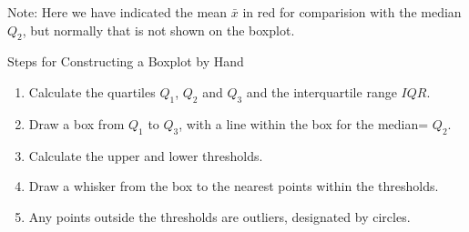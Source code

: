 \documentclass[t,xcolor=pdftex,dvipsnames,table]{beamer}
\begin{document}
\begin{frame}[fragile]{}
\vspace{1cm}

\vspace{.5cm}
Note: Here we have indicated the mean $\bar{x}$ in red for comparision with the median $Q_{2}$, but normally that is not shown on the boxplot.
\end{frame}

\begin{frame}[fragile]{Steps for Constructing a Boxplot by Hand}
\begin{enumerate}
\item Calculate the quartiles $Q_1$, $Q_2$ and $Q_3$ and the interquartile range $IQR$. 
\item Draw a box from $Q_1$ to $Q_3$, with a line within the box for the median= $Q_2$.
\item Calculate the upper and lower thresholds.
\item Draw a whisker from the box to the nearest points within the thresholds.
\item Any points outside the thresholds are outliers, designated by circles.
\end{enumerate}
\end{frame}
\end{document}
